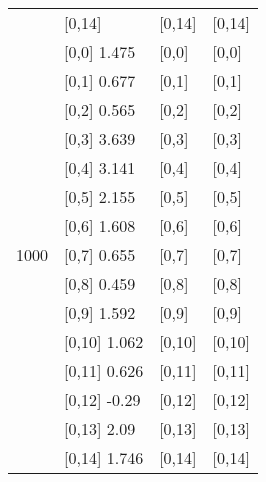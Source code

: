 \begin{table}
\begin{tabular}[t]{llll}
 & {}[0,14] & {}[0,14] & {}[0,14]\\
\addlinespace
 & {}[0,0] 1.475 & {}[0,0] & {}[0,0]\\
 & {}[0,1] 0.677 & {}[0,1] & {}[0,1]\\
 & {}[0,2] 0.565 & {}[0,2] & {}[0,2]\\
 & {}[0,3] 3.639 & {}[0,3] & {}[0,3]\\
 & {}[0,4] 3.141 & {}[0,4] & {}[0,4]\\
\addlinespace
 & {}[0,5] 2.155 & {}[0,5] & {}[0,5]\\
 & {}[0,6] 1.608 & {}[0,6] & {}[0,6]\\
1000 & {}[0,7] 0.655 & {}[0,7] & {}[0,7]\\
 & {}[0,8] 0.459 & {}[0,8] & {}[0,8]\\
 & {}[0,9] 1.592 & {}[0,9] & {}[0,9]\\
\addlinespace
 & {}[0,10] 1.062 & {}[0,10] & {}[0,10]\\
 & {}[0,11] 0.626 & {}[0,11] & {}[0,11]\\
 & {}[0,12] -0.29 & {}[0,12] & {}[0,12]\\
 & {}[0,13] 2.09 & {}[0,13] & {}[0,13]\\
 & {}[0,14] 1.746 & {}[0,14] & {}[0,14]\\
\bottomrule
\end{tabular}
\end{table}
